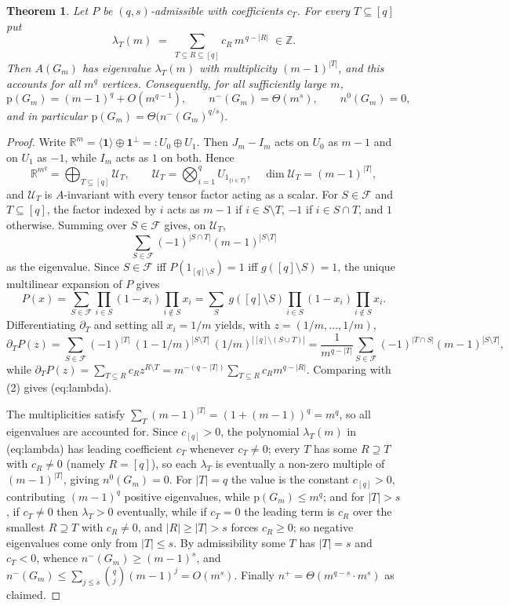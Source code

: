 \documentclass[11pt,a4paper]{article}
\theoremstyle{plain}
\newtheorem{theorem}{Theorem}[section]
\theoremstyle{definition}
\newcommand{\ZZ}{\mathbb{Z}}
\newcommand{\RR}{\mathbb{R}}
\newcommand{\pp}{\mathrm{p}}
\begin{document}
\begin{theorem}
\label{thm:spectrum}
Let $P$ be $(q,s)$-admissible with coefficients $c_T$.  For every $T\subseteq[q]$ put
\begin{equation}
\label{eq:lambda}
\lambda_T(m)\;=\;\sum_{T\subseteq R\subseteq[q]} c_R\, m^{\,q-|R|}\;\in\ZZ .
\end{equation}
Then $A(G_m)$ has eigenvalue $\lambda_T(m)$ with multiplicity $(m-1)^{|T|}$, and this
accounts for all $m^q$ vertices.  Consequently, for all sufficiently large $m$,
\[
\pp(G_m)=(m-1)^q+O(m^{q-1}),\qquad
n^-(G_m)=\Theta(m^s),\qquad n^0(G_m)=0,
\]
and in particular $\pp(G_m)=\Theta\big(n^-(G_m)^{q/s}\big)$.
\end{theorem}

\begin{proof}
Write $\RR^m=\langle\mathbf 1\rangle\oplus\mathbf 1^\perp=:U_0\oplus U_1$.  Then
$J_m-I_m$ acts on $U_0$ as $m-1$ and on $U_1$ as $-1$, while $I_m$ acts as $1$ on both.
Hence
\[
\RR^{m^q}=\bigoplus_{T\subseteq[q]}\mathcal U_T,\qquad
\mathcal U_T=\bigotimes_{i=1}^q U_{1_{\{i\in T\}}},
\quad \dim\mathcal U_T=(m-1)^{|T|},
\]
and $\mathcal U_T$ is $A$-invariant with every tensor factor acting as a scalar.  For
$S\in\mathcal F$ and $T\subseteq[q]$, the factor indexed by $i$ acts as
$m-1$ if $i\in S\setminus T$, $-1$ if $i\in S\cap T$, and $1$ otherwise.  Summing over
$S\in\mathcal F$ gives, on $\mathcal U_T$,
\[
\sum_{S\in\mathcal F}(-1)^{|S\cap T|}(m-1)^{|S\setminus T|} \tag{2}
\]
as the eigenvalue.  Since $S\in\mathcal F$ iff $P(1_{[q]\setminus S})=1$ iff
$g([q]\setminus S)=1$, the unique multilinear expansion of $P$ gives
\[
P(x)=\sum_{S\in\mathcal F}\prod_{i\in S}(1-x_i)\prod_{i\notin S}x_i
     =\sum_{S}\ g([q]\setminus S)\prod_{i\in S}(1-x_i)\prod_{i\notin S}x_i .
\]
Differentiating $\partial_T$ and setting all $x_i=1/m$ yields, with $z=(1/m,\dots,1/m)$,
\[
\partial_TP(z)=\sum_{S\in\mathcal F}(-1)^{|T|}\ (1-1/m)^{|S\setminus T|}\ (1/m)^{|[q]\setminus(S\cup T)|}
=\frac{1}{m^{q-|T|}}\sum_{S\in\mathcal F}(-1)^{|T\cap S|}(m-1)^{|S\setminus T|},
\]
while $\partial_TP(z)=\sum_{T\subseteq R}c_Rz^{R\setminus T}=m^{-(q-|T|)}\sum_{T\subseteq R}c_Rm^{q-|R|}$.
Comparing with (2) gives \textup{(eq:lambda)}.

The multiplicities satisfy $\sum_{T}(m-1)^{|T|}=(1+(m-1))^q=m^q$, so all eigenvalues
are accounted for.  Since $c_{[q]}>0$, the polynomial $\lambda_T(m)$ in (eq:lambda) has
leading coefficient $c_T$ whenever $c_T\ne0$; every $T$ has some $R\supseteq T$ with
$c_R\ne0$ (namely $R=[q]$), so each $\lambda_T$ is eventually a non-zero multiple of
$(m-1)^{|T|}$, giving $n^0(G_m)=0$.  For $|T|=q$ the value is the constant $c_{[q]}>0$,
contributing $(m-1)^q$ positive eigenvalues, while $\pp(G_m)\le m^q$; and for $|T|>s$,
if $c_T\ne0$ then $\lambda_T>0$ eventually, while if $c_T=0$ the leading term is
$c_R$ over the smallest $R\supseteq T$ with $c_R\ne0$, and $|R|\ge|T|>s$ forces
$c_R\ge0$; so negative eigenvalues come only from $|T|\le s$.  By admissibility some
$T$ has $|T|=s$ and $c_T<0$, whence $n^-(G_m)\ge(m-1)^s$, and
$n^-(G_m)\le\sum_{j\le s}\binom qj(m-1)^j=O(m^s)$.  Finally
$n^+=\Theta(m^{q-s}\cdot m^s)$ as claimed.
\end{proof}
\end{document}
